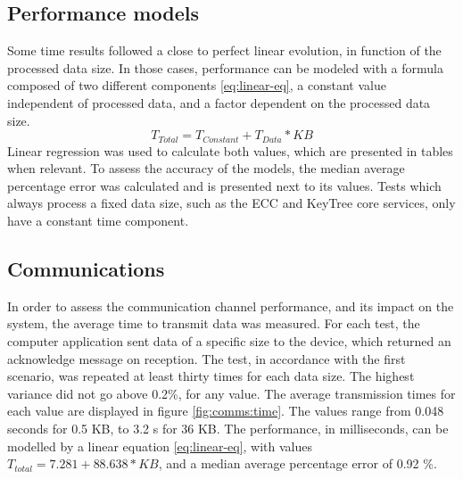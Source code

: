 \subsection{Performance models}\label{chap:evaluation:performance:models}

Some time results followed a close to perfect linear evolution, in function of the processed data size. In those cases, performance can be modeled with a formula composed of two different components \ref{eq:linear-eq}, a constant value independent of processed data, and a factor dependent on the processed data size.
\begin{equation}
	\label{eq:linear-eq}
	T_{Total} = T_{Constant} + T_{Data} * KB
\end{equation}
Linear regression was used to calculate both values, which are presented in tables when relevant. To assess the accuracy of the models, the median average percentage error was calculated and is presented next to its values. Tests which always process a fixed data size, such as the ECC and KeyTree core services, only have a constant time component.

\subsection{Communications}\label{chap:evaluation:performance:comms}

In order to assess the communication channel performance, and its impact on the system, the average time to transmit data was measured. For each test, the computer application sent data of a specific size to the device, which returned an acknowledge message on reception. The test, in accordance with the first scenario, was repeated at least thirty times for each data size. The highest variance did not go above 0.2\%, for any value.
The average transmission times for each value are displayed in figure \ref{fig:comms:time}.
The values range from 0.048 seconds for 0.5 KB, to 3.2 s for 36 KB.
The performance, in milliseconds, can be modelled by a linear equation \ref{eq:linear-eq}, with values \(T_{total} = 7.281 + 88.638 * KB\), and a median average percentage error of 0.92 \%.

